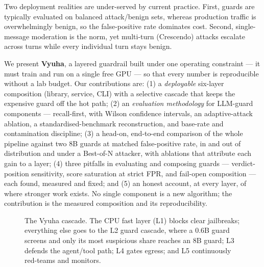 \documentclass[11pt]{article}
\begin{document}
Two deployment realities are under-served by current practice. First, guards are typically evaluated
on balanced attack/benign sets, whereas production traffic is overwhelmingly benign, so the
false-positive rate dominates cost. Second, single-message moderation is the norm, yet multi-turn
(Crescendo) attacks \citep{crescendo} escalate across turns while every individual turn stays benign.

We present \textbf{Vyuha}, a layered guardrail built under one operating constraint --- it must train
and run on a single free GPU --- so that every number is reproducible without a lab budget. Our
contributions are: (1) a \emph{deployable} six-layer composition (library, service, CLI) with a
selective cascade that keeps the expensive guard off the hot path; (2) an \emph{evaluation
methodology} for LLM-guard components --- recall-first, with Wilson confidence intervals, an
adaptive-attack ablation, a standardised-benchmark reconstruction, and base-rate and contamination
discipline; (3) a head-on, end-to-end comparison of the whole pipeline against two 8B guards at matched
false-positive rate, in and out of distribution and under a Best-of-N attacker, with ablations that attribute each gain to a layer; (4) three pitfalls in evaluating and composing guards --- verdict-position sensitivity,
score saturation at strict FPR, and fail-open composition --- each found, measured and fixed; and (5) an
honest account, at every layer, of where stronger work exists. No single
component is a new algorithm; the contribution is the measured composition and its reproducibility.

\begin{figure}[t]
\centering
{}
\caption{The Vyuha cascade. The CPU fast layer (L1) blocks clear jailbreaks; everything else goes to
the L2 guard cascade, where a 0.6B guard screens and only its most suspicious share reaches an 8B guard;
L3 defends the agent/tool path; L4 gates
egress; and L5 continuously red-teams and monitors.}
\label{fig:arch}
\end{figure}
\end{document}
